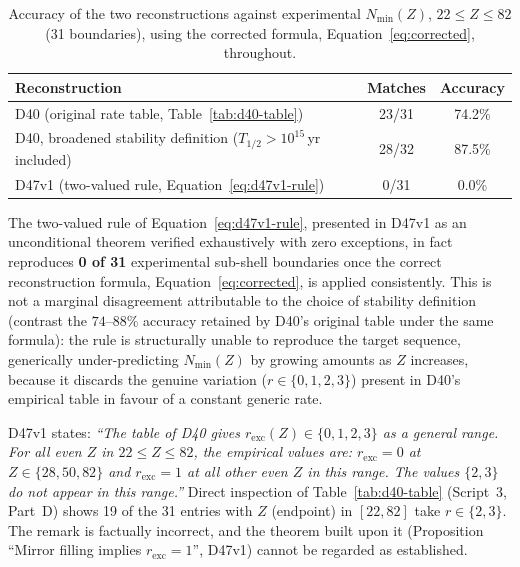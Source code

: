 \documentclass[12pt,a4paper]{article}
\theoremstyle{plain}
\theoremstyle{definition}
\theoremstyle{remark}
\newenvironment{negativebox}[1][]{%
\begin{tcolorbox}[negativestyle,title={Negative Result\ifx\relax#1\relax\else: #1\fi}]}{\end{tcolorbox}}
\newcommand{\Nmin}{N_{\min}}
\newcommand{\rexc}{r_{\mathrm{exc}}}
\begin{document}
\begin{table}[H]
\centering
\caption{Accuracy of the two reconstructions against experimental $\Nmin(Z)$, $22\le Z\le82$ (31 boundaries), using the corrected formula, Equation~\eqref{eq:corrected}, throughout.}
\label{tab:accuracy}
\begin{tabular}{lcc}
\toprule
Reconstruction & Matches & Accuracy \\
\midrule
D40 (original rate table, Table~\ref{tab:d40-table}) & 23/31 & 74.2\% \\
D40, broadened stability definition ($T_{1/2}>10^{15}$\,yr included) & 28/32 & 87.5\% \\
D47v1 (two-valued rule, Equation~\eqref{eq:d47v1-rule}) & 0/31 & 0.0\% \\
\bottomrule
\end{tabular}
\end{table}

\begin{negativebox}[D47v1's Theorem OP14]
\label{neg:op14}
The two-valued rule of Equation~\eqref{eq:d47v1-rule}, presented in D47v1 as an unconditional theorem verified exhaustively with zero exceptions, in fact reproduces \textbf{0 of 31} experimental sub-shell boundaries once the correct reconstruction formula, Equation~\eqref{eq:corrected}, is applied consistently. This is not a marginal disagreement attributable to the choice of stability definition (contrast the $74$--$88\%$ accuracy retained by D40's original table under the same formula): the rule is structurally unable to reproduce the target sequence, generically under-predicting $\Nmin(Z)$ by growing amounts as $Z$ increases, because it discards the genuine variation ($r\in\{0,1,2,3\}$) present in D40's empirical table in favour of a constant generic rate.
\end{negativebox}

\begin{negativebox}[Factual content of the D47v1 remark on D40's table]
\label{neg:remark}
D47v1 states: \emph{``The table of D40 gives $\rexc(Z)\in\{0,1,2,3\}$ as a general range. For all even $Z$ in $22\le Z\le82$, the empirical values are: $\rexc=0$ at $Z\in\{28,50,82\}$ and $\rexc=1$ at all other even $Z$ in this range. The values $\{2,3\}$ do not appear in this range.''} Direct inspection of Table~\ref{tab:d40-table} (Script~3, Part~D) shows 19 of the 31 entries with $Z$ (endpoint) in $[22,82]$ take $r\in\{2,3\}$. The remark is factually incorrect, and the theorem built upon it (Proposition ``Mirror filling implies $\rexc=1$'', D47v1) cannot be regarded as established.
\end{negativebox}
\end{document}

